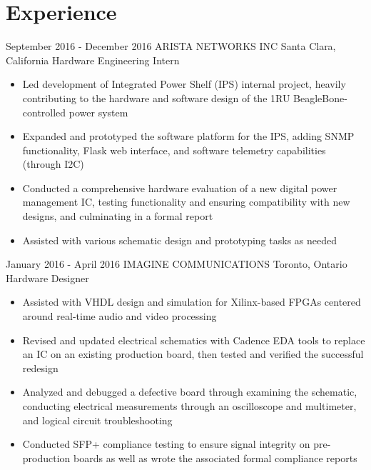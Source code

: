 \documentclass[hidelinks]{kkurucz-cv}
\begin{document}
\vspace{-4.5mm}
\begin{minipage}{\textwidth}
\section{Experience}

\vspace{1mm}
\begin{entrylist}
\entry
{September 2016 - December 2016}
{ARISTA NETWORKS INC}
{Santa Clara, California}
{Hardware Engineering Intern}
{
\begin{itemize}
	\item Led development of Integrated Power Shelf (IPS) internal project, heavily contributing to the hardware and software design of the 1RU BeagleBone-controlled power system
	\item Expanded and prototyped the software platform for the IPS, adding SNMP functionality, Flask web interface, and software telemetry capabilities (through I2C)
	\item Conducted a comprehensive hardware evaluation of a new digital power management IC, testing functionality and ensuring compatibility with new designs, and culminating in a formal report
	\item Assisted with various schematic design and prototyping tasks as needed
\end{itemize}
}

\entry
{January 2016 - April 2016}
{IMAGINE COMMUNICATIONS}
{Toronto, Ontario}
{Hardware Designer}
{
\begin{itemize}
	\item Assisted with VHDL design and simulation for Xilinx-based FPGAs centered around real-time audio and video processing
	\item Revised and updated electrical schematics with Cadence EDA tools to replace an IC on an existing production board, then tested and verified the successful redesign
	\item Analyzed and debugged a defective board through examining the schematic, conducting electrical measurements through an oscilloscope and multimeter, and logical circuit troubleshooting
	\item Conducted SFP+ compliance testing to ensure signal integrity on pre-production boards as well as wrote the associated formal compliance reports
\end{itemize}
}


\end{entrylist}
\end{minipage}
\end{document}
